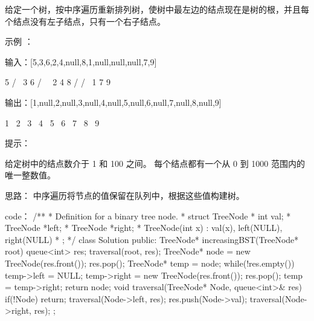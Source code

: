 给定一个树，按中序遍历重新排列树，使树中最左边的结点现在是树的根，并且每个结点没有左子结点，只有一个右子结点。

 

示例 ：

输入：[5,3,6,2,4,null,8,1,null,null,null,7,9]

       5
      / \
    3    6
   / \    \
  2   4    8
 /        / \ 
1        7   9

输出：[1,null,2,null,3,null,4,null,5,null,6,null,7,null,8,null,9]

 1
  \
   2
    \
     3
      \
       4
        \
         5
          \
           6
            \
             7
              \
               8
                \
                 9  

 

提示：

    给定树中的结点数介于 1 和 100 之间。
    每个结点都有一个从 0 到 1000 范围内的唯一整数值。





























思路：
中序遍历将节点的值保留在队列中，根据这些值构建树。




























code：
/**
 * Definition for a binary tree node.
 * struct TreeNode {
 *     int val;
 *     TreeNode *left;
 *     TreeNode *right;
 *     TreeNode(int x) : val(x), left(NULL), right(NULL) {}
 * };
 */
class Solution {
public:
    TreeNode* increasingBST(TreeNode* root) {
        queue<int> res;
        traversal(root, res);
        TreeNode* node = new TreeNode(res.front());
        res.pop();
        TreeNode* temp = node;
        while(!res.empty())
        {
            temp->left = NULL;
            temp->right = new TreeNode(res.front());
            res.pop();
            temp = temp->right;
        }
        return node;
    }
    void traversal(TreeNode* Node, queue<int>& res)
    {
        if(!Node) return;
        traversal(Node->left, res); 
        res.push(Node->val);
        traversal(Node->right, res);
    }
};